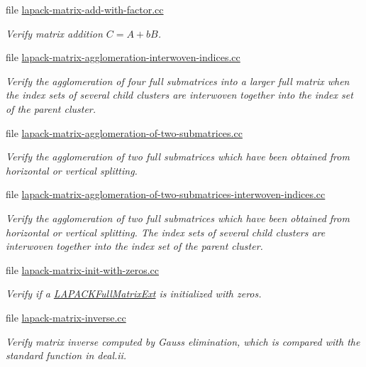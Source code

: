 \begin{DoxyCompactItemize}
file \hyperlink{lapack-matrix-add-with-factor_8cc}{lapack-\/matrix-\/add-\/with-\/factor.\+cc}
\begin{DoxyCompactList}\small\item\em Verify matrix addition $C = A + b B$. \end{DoxyCompactList}\item 
file \hyperlink{lapack-matrix-agglomeration-interwoven-indices_8cc}{lapack-\/matrix-\/agglomeration-\/interwoven-\/indices.\+cc}
\begin{DoxyCompactList}\small\item\em Verify the agglomeration of four full submatrices into a larger full matrix when the index sets of several child clusters are interwoven together into the index set of the parent cluster. \end{DoxyCompactList}\item 
file \hyperlink{lapack-matrix-agglomeration-of-two-submatrices_8cc}{lapack-\/matrix-\/agglomeration-\/of-\/two-\/submatrices.\+cc}
\begin{DoxyCompactList}\small\item\em Verify the agglomeration of two full submatrices which have been obtained from horizontal or vertical splitting. \end{DoxyCompactList}\item 
file \hyperlink{lapack-matrix-agglomeration-of-two-submatrices-interwoven-indices_8cc}{lapack-\/matrix-\/agglomeration-\/of-\/two-\/submatrices-\/interwoven-\/indices.\+cc}
\begin{DoxyCompactList}\small\item\em Verify the agglomeration of two full submatrices which have been obtained from horizontal or vertical splitting. The index sets of several child clusters are interwoven together into the index set of the parent cluster. \end{DoxyCompactList}\item 
file \hyperlink{lapack-matrix-init-with-zeros_8cc}{lapack-\/matrix-\/init-\/with-\/zeros.\+cc}
\begin{DoxyCompactList}\small\item\em Verify if a \hyperlink{classLAPACKFullMatrixExt}{L\+A\+P\+A\+C\+K\+Full\+Matrix\+Ext} is initialized with zeros. \end{DoxyCompactList}\item 
file \hyperlink{lapack-matrix-inverse_8cc}{lapack-\/matrix-\/inverse.\+cc}
\begin{DoxyCompactList}\small\item\em Verify matrix inverse computed by Gauss elimination, which is compared with the standard function in deal.\+ii. \end{DoxyCompactList}\item 

\end{DoxyCompactItemize}
